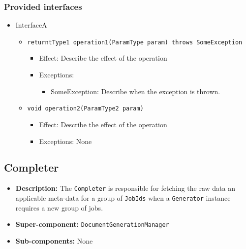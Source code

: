 \documentclass[a4paper,10pt]{article}
\begin{document}
\subsubsection*{Provided interfaces}
\begin{itemize}
    \item InterfaceA
    \begin{itemize}
        \item \texttt{returntType1 operation1(ParamType param) throws SomeException}
        \begin{itemize}
            \item Effect: Describe the effect of the operation
            \item Exceptions:
            \begin{itemize}
                \item SomeException: Describe when the exception is thrown.
            \end{itemize}
		\end{itemize}
		
        \item \texttt{void operation2(ParamType2 param)}
        \begin{itemize}
            \item Effect: Describe the effect of the operation
            \item Exceptions: None
        \end{itemize}  
    \end{itemize}
\end{itemize}


\subsection{Completer}
\begin{itemize}
    \item \textbf{Description:} The \texttt{Completer} is responsible for fetching the raw data an applicable meta-data for a group of \texttt{JobIds} when a \texttt{Generator} instance requires a new group of jobs.
    \item \textbf{Super-component:} \texttt{DocumentGenerationManager}
    \item \textbf{Sub-components:} None
\end{itemize}
\end{document}
